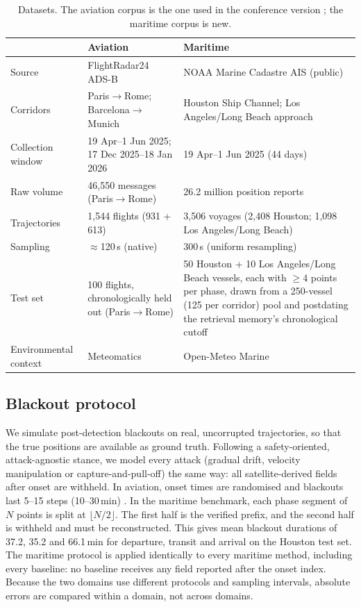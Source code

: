 \begin{table}[t]
\centering
\caption{Datasets. The aviation corpus is the one used in the conference
version \citep{felendler2026trajrag}; the maritime corpus is new.}
\label{tab:datasets}
\footnotesize
\begin{tabular}{p{2.5cm}p{4.3cm}p{4.3cm}}
\toprule
 & Aviation & Maritime \\
\midrule
Source & FlightRadar24 ADS-B & NOAA Marine Cadastre AIS (public) \citep{noaa2025marinecadastre} \\
Corridors & Paris$\to$Rome; Barcelona$\to$Munich & Houston Ship Channel; Los Angeles/Long Beach approach \\
Collection window & 19 Apr--1 Jun 2025; 17 Dec 2025--18 Jan 2026 & 19 Apr--1 Jun 2025 (44 days) \\
Raw volume & 46,550 messages (Paris$\to$Rome) & 26.2 million position reports \\
Trajectories & 1,544 flights (931 + 613) & 3,506 voyages (2,408 Houston; 1,098 Los Angeles/Long Beach) \\
Sampling & $\approx$120\,s (native) & 300\,s (uniform resampling) \\
Test set & 100 flights, chronologically held out (Paris$\to$Rome) & 50 Houston + 10 Los Angeles/Long Beach vessels, each with $\geq 4$ points per phase, drawn from a 250-vessel (125 per corridor) pool and postdating the retrieval memory's chronological cutoff \\
Environmental context & Meteomatics & Open-Meteo Marine \citep{openmeteo2025} \\
\bottomrule
\end{tabular}
\end{table}

\subsection{Blackout protocol}

We simulate post-detection blackouts on real, uncorrupted trajectories, so
that the true positions are available as ground truth. Following a
safety-oriented, attack-agnostic stance, we model every attack (gradual
drift, velocity manipulation or capture-and-pull-off) the same way: all
satellite-derived fields after onset are withheld. In aviation, onset times
are randomised and blackouts last 5--15 steps (10--30\,min)
\citep{felendler2026trajrag}. In the maritime benchmark, each phase segment
of $N$ points is split at $\lfloor N/2 \rfloor$. The first half is the
verified prefix, and the second half is withheld and must be reconstructed.
This gives mean blackout durations of 37.2, 35.2 and 66.1\,min for
departure, transit and arrival on the Houston test set. The maritime
protocol is applied identically to every maritime method, including every
baseline: no baseline receives any field reported after the onset index.
Because the two domains use different protocols and sampling intervals,
absolute errors are compared within a domain, not across domains.

